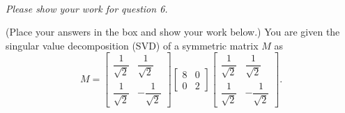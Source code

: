 \documentclass[letterpaper]{article}
\begin{document}
~~~~~~~~~~~~~~~~~~~~~~~~~~~~~~~






\newpage
\textit{Please show your work for question 6.}


\newpage



  (Place your answers in the box and show your work below.)  You are given the singular value decomposition (SVD) of a symmetric matrix $M$ as
\begin{equation}\label{eqn:eig_decomp}
  M=\left[  \begin{array}{cc} \dfrac{1}{\sqrt{2}} & \dfrac{1}{\sqrt{2}}\\[5mm] \dfrac{1}{\sqrt{2}} & -\dfrac{1}{\sqrt{2}}\end{array} \right]
  \left[  \begin{array}{cc} 8 & 0 \\[2mm] 0 & 2\end{array} \right]
  \left[  \begin{array}{cc} \dfrac{1}{\sqrt{2}} & \dfrac{1}{\sqrt{2}}\\[5mm] \dfrac{1}{\sqrt{2}} & -\dfrac{1}{\sqrt{2}}\end{array} \right].
\end{equation}
\end{document}
